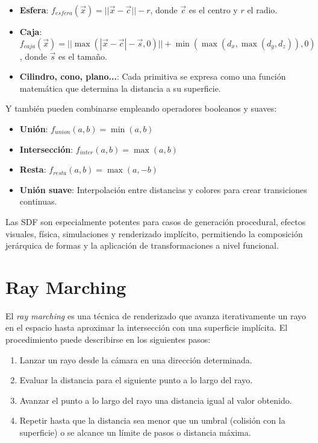 \begin{itemize}
    \item \textbf{Esfera}: $f_{esfera}(\vec{x}) = ||\vec{x} - \vec{c}|| - r$, donde $\vec{c}$ es el centro y $r$ el radio.
    \item \textbf{Caja}: $f_{caja}(\vec{x}) = ||\max(|\vec{x} - \vec{c}| - \vec{s}, 0)|| + \min(\max(d_x, \max(d_y, d_z)), 0)$, donde $\vec{s}$ es el tamaño.
    \item \textbf{Cilindro, cono, plano...}: Cada primitiva se expresa como una función matemática que determina la distancia a su superficie.
\end{itemize}

Y también pueden combinarse empleando operadores booleanos y suaves:

\begin{itemize}
    \item \textbf{Unión}: $f_{union}(a, b) = \min(a, b)$
    \item \textbf{Intersección}: $f_{inter}(a, b) = \max(a, b)$
    \item \textbf{Resta}: $f_{resta}(a, b) = \max(a, -b)$
    \item \textbf{Unión suave}: Interpolación entre distancias y colores para crear transiciones continuas.
\end{itemize}

Las SDF son especialmente potentes para casos de generación procedural, efectos
visuales, física, simulaciones y renderizado implícito, permitiendo la
composición jerárquica de formas y la aplicación de transformaciones a nivel
funcional.

\section{Ray Marching}

El \textit{ray marching} es una técnica de renderizado que avanza
iterativamente un rayo en el espacio hasta aproximar la intersección con una
superficie implícita\cite{hart1996,pbrt3}. El procedimiento puede describirse
en los siguientes pasos:

\begin{enumerate}
    \item Lanzar un rayo desde la cámara en una dirección determinada.
    \item Evaluar la distancia para el siguiente punto a lo largo del rayo.
    \item Avanzar el punto a lo largo del rayo una distancia igual al valor obtenido.
    \item Repetir hasta que la distancia sea menor que un umbral (colisión con la
          superficie) o se alcance un límite de pasos o distancia máxima.
\end{enumerate}

